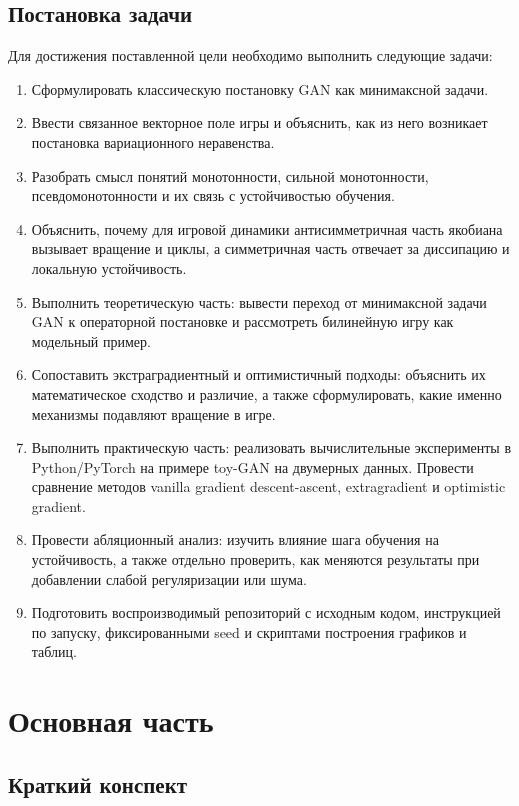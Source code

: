 \documentclass[12pt,a4paper]{article}
\begin{document}
	\subsection{Постановка задачи}
	Для достижения поставленной цели необходимо выполнить следующие задачи:
	\begin{enumerate}
		\item Сформулировать классическую постановку GAN как минимаксной задачи.
		\item Ввести связанное векторное поле игры и объяснить, как из него возникает постановка вариационного неравенства.
		\item Разобрать смысл понятий монотонности, сильной монотонности, псевдомонотонности и их связь с устойчивостью обучения.
		\item Объяснить, почему для игровой динамики антисимметричная часть якобиана вызывает вращение и циклы, а симметричная часть отвечает за диссипацию и локальную устойчивость.
		\item Выполнить теоретическую часть:  вывести переход от минимаксной задачи GAN к операторной постановке и рассмотреть билинейную игру как модельный пример.
		\item Сопоставить экстраградиентный и оптимистичный подходы: объяснить их математическое сходство и различие, а также сформулировать, какие именно механизмы подавляют вращение в игре.
		\item Выполнить практическую часть: реализовать вычислительные эксперименты в Python/PyTorch на примере toy-GAN на двумерных данных. Провести сравнение методов vanilla gradient descent-ascent, extragradient и optimistic gradient.
		\item Провести абляционный анализ: изучить влияние шага обучения на устойчивость, а также отдельно проверить, как меняются результаты при добавлении слабой регуляризации или шума.
		\item Подготовить воспроизводимый репозиторий с исходным кодом, инструкцией по запуску, фиксированными seed и скриптами построения графиков и таблиц.
	\end{enumerate}
	
	\section{Основная часть}
	
	\subsection{Краткий конспект}
\end{document}
